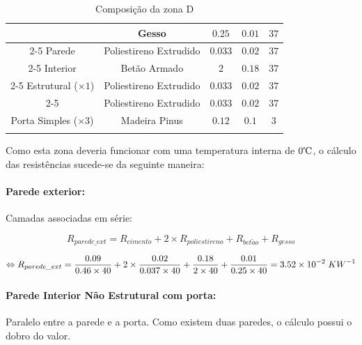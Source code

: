 \documentclass[12pt, a4paper]{article}
\begin{document}
\begin{table}[htpb]
\begin{center}
\begin{tabular}{c c c c c}
            \multirow{5}{*}{} & Gesso & $0.25$ & $0.01$ & $37$ \\
            \cline{2-5}
            Parede & Poliestireno Extrudido & $0.033$ & $0.02$ & $37$ \\
            \cline{2-5}
            Interior & Bet\~ao Armado & $2$ & $0.18$ & $37$ \\
            \cline{2-5}
            Estrutural ($\times 1$) & Poliestireno Extrudido & $0.033$ & $0.02$ & $37$ \\
            \cline{2-5}
                    & Poliestireno Extrudido & $0.033$ & $0.02$ & $37$ \\
            \midrule{}

            Porta Simples ($\times 3$) & Madeira Pinus & $0.12$ & $0.1$ & $3$ \\
            \bottomrule{}
        \end{tabular}
    \end{center}
    \caption{Composi\c{c}\~ao da zona D}\label{tab:zona_d}
\end{table}

Como esta zona deveria funcionar com uma temperatura interna de $0{\celsius}$, o c\'alculo das
resist\^encias sucede-se da seguinte maneira:

\paragraph{Parede exterior:}\label{par:zona_d_ext}Camadas associadas em s\'erie:

\begin{equation}
    R_{parede\_ext} = R_{cimento} + 2 \times R_{poliestireno} + R_{bet\tilde{a}o} + R_{gesso}
    \label{eq:zona_d_ext_1}
\end{equation}

\begin{equation}
    \Leftrightarrow R_{parede\_ext} =
        \dfrac{0.09}{0.46 \times 40} +
        2 \times \dfrac{0.02}{0.037 \times 40} +
        \dfrac{0.18}{2 \times 40} +
        \dfrac{0.01}{0.25 \times 40} = 3.52 \times 10^{-2} \hspace{1mm} KW^{-1}
    \label{eq:zona_d_ext_2}
\end{equation}


\paragraph{Parede Interior N\~ao Estrutural com porta:}\label{par:zona_d_int_n_est}Paralelo entre a parede e a porta. Como existem duas paredes, o c\'alculo possui o dobro do valor.
\end{document}
